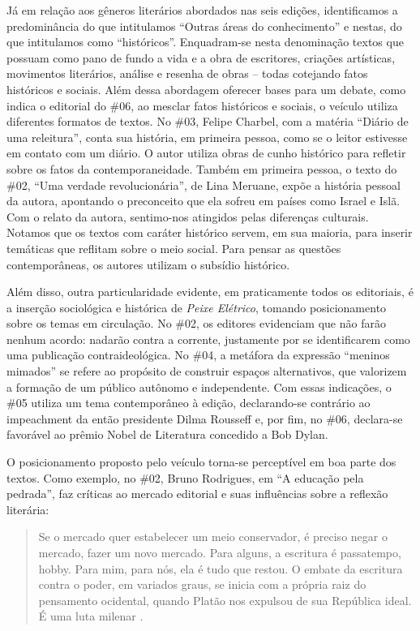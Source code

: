 \documentclass[portuguese]{textolivre}
\begin{document}
Já em relação aos gêneros literários abordados nas seis edições, identificamos a predominância do que intitulamos “Outras áreas do conhecimento” e nestas, do que intitulamos como “históricos”. Enquadram-se nesta denominação textos que possuam como pano de fundo a vida e a obra de escritores, criações artísticas, movimentos literários, análise e resenha de obras – todas cotejando fatos históricos e sociais. Além dessa abordagem oferecer bases para um debate, como indica o editorial do \#06, ao mesclar fatos históricos e sociais, o veículo utiliza diferentes formatos de textos. No \#03, Felipe Charbel, com a matéria “Diário de uma releitura”, conta sua história, em primeira pessoa, como se o leitor estivesse em contato com um diário. O autor utiliza obras de cunho histórico para refletir sobre os fatos da contemporaneidade. Também em primeira pessoa, o texto do \#02, “Uma verdade revolucionária”, de Lina Meruane, expõe a história pessoal da autora, apontando o preconceito que ela sofreu em países como Israel e Islã. Com o relato da autora, sentimo-nos atingidos pelas diferenças culturais. Notamos que os textos com caráter histórico servem, em sua maioria, para inserir temáticas que reflitam sobre o meio social. Para pensar as questões contemporâneas, os autores utilizam o subsídio histórico.

Além disso, outra particularidade evidente, em praticamente todos os editoriais, é a inserção sociológica e histórica de \textit{Peixe Elétrico}, tomando posicionamento sobre os temas em circulação. No \#02, os editores evidenciam que não farão nenhum acordo: nadarão contra a corrente, justamente por se identificarem como uma publicação contraideológica. No \#04, a metáfora da expressão “meninos mimados” se refere ao propósito de construir espaços alternativos, que valorizem a formação de um público autônomo e independente. Com essas indicações, o \#05 utiliza um tema contemporâneo à edição, declarando-se contrário ao impeachment da então presidente Dilma Rousseff e, por fim, no \#06, declara-se favorável ao prêmio Nobel de Literatura concedido a Bob Dylan.

O posicionamento proposto pelo veículo torna-se perceptível em boa parte dos textos. Como exemplo, no \#02, Bruno Rodrigues, em “A educação pela pedrada”, faz críticas ao mercado editorial e suas influências sobre a reflexão literária:

\begin{quote}
    Se o mercado quer estabelecer um meio conservador, é preciso negar o mercado, fazer um novo mercado. Para alguns, a escritura é passatempo, hobby. Para mim, para nós, ela é tudo que restou. O embate da escritura contra o poder, em variados graus, se inicia com a própria raiz do pensamento ocidental, quando Platão nos expulsou de sua República ideal. É uma luta milenar \cite[n.2, s/p]{rodrigues2015educacao}. 
\end{quote}
\end{document}
